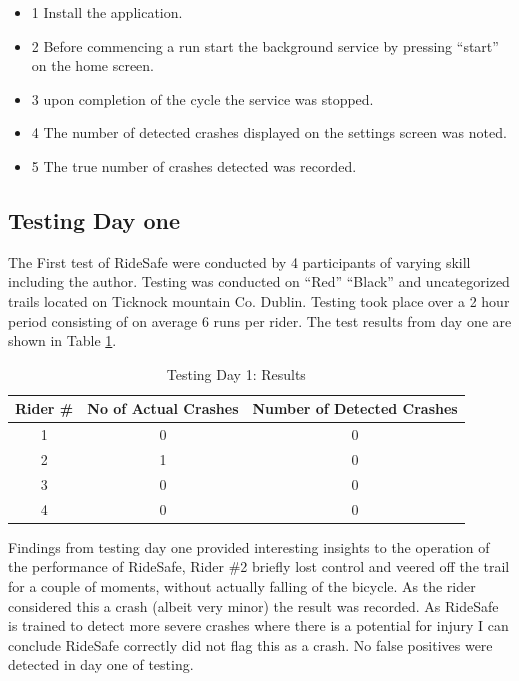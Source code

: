 \begin{itemize}


\item 1 Install the application.
\item 2 Before commencing a run start the background service by pressing “start” on the home screen.
\item 3 upon completion of the cycle the service was stopped.
\item 4 The number of detected crashes displayed on the settings screen was noted.
\item 5 The true number of crashes detected was recorded.
\end {itemize}

\subsection*{Testing Day one}

The First test of RideSafe were conducted by 4 participants of varying skill including the author. Testing was conducted on “Red” “Black” and uncategorized trails located on Ticknock mountain Co. Dublin. Testing took place over a 2 hour period consisting of on average 6 runs per rider. The test results from day one are shown in Table \ref{day1}.

\vspace{1cm}
\begin{table}
\caption{Testing Day 1: Results}
\label{day1}
\begin{center}
 \begin{tabular}{||c |c |c ||} 
 \hline
 Rider \# & No of Actual Crashes & Number of Detected Crashes \\ [0.5ex] 
 \hline\hline
 1& 0 & 0 \\ 
 \hline
 2& 1 & 0 \\ 
 \hline
 3 & 0 & 0\\
 \hline
4 & 0 & 0 \\ [1ex] 
 \hline
\end{tabular}
\end{center}
\end{table}

\vspace{1cm}
Findings from testing day one provided interesting insights to the operation of the performance of RideSafe, Rider \#2 briefly lost control and veered off the trail for a couple of moments, without actually falling of the bicycle. As the rider considered this a crash (albeit very minor) the result was recorded. As RideSafe is trained to detect more severe crashes where there is a potential for injury I can conclude RideSafe correctly did not flag this as a crash. No false positives were detected in day one of testing.


